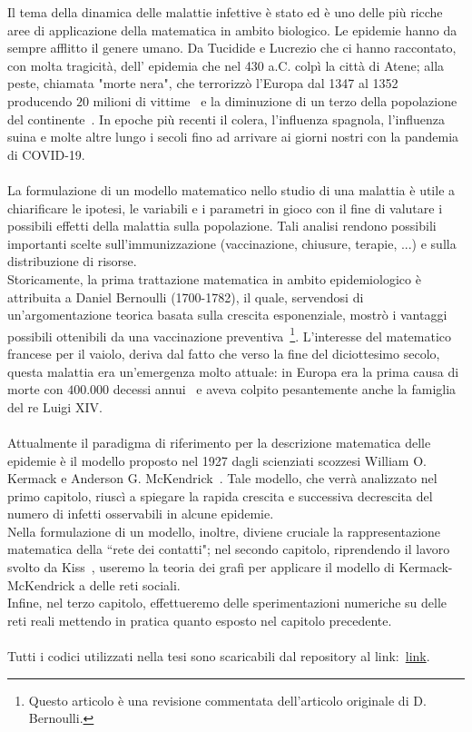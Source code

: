 \documentclass[12pt,a4paper,twoside]{report}
\begin{document}
Il tema della dinamica delle malattie infettive \`e stato ed \`e uno delle pi\`u ricche aree di applicazione della matematica in ambito biologico.  Le epidemie hanno  da sempre afflitto il genere umano.  Da Tucidide e Lucrezio che ci hanno raccontato,  con molta tragicit\`a,  dell' epidemia che nel 430 a.C.  colp\`i la citt\`a di Atene; alla  peste,  chiamata "morte nera",   che terrorizz\`o l'Europa dal 1347 al 1352 producendo $20$ milioni di vittime~\cite{ujvari2020storia} e  la diminuzione di  un terzo della popolazione del continente~\cite{alchon2003pest}.  In epoche pi\`u recenti il colera,  l'influenza spagnola,  l'influenza suina e molte altre lungo i  secoli fino ad arrivare ai giorni nostri con la pandemia di COVID-19.\\ \\
La formulazione di un modello matematico nello studio di una malattia \`e utile a chiarificare le ipotesi, le variabili e i parametri in gioco con il fine di valutare i possibili effetti della malattia sulla popolazione. Tali analisi rendono possibili importanti scelte sull'immunizzazione (vaccinazione,  chiusure,  terapie,  ...) e sulla distribuzione di risorse.\\ Storicamente,  la prima trattazione matematica in ambito   epidemiologico \`e attribuita  a Daniel Bernoulli (1700-1782), il quale, servendosi di un'argomentazione teorica basata sulla crescita esponenziale,  mostr\`o i  vantaggi possibili ottenibili da una vaccinazione preventiva~\cite{Bernoulli}\footnote{Questo articolo \`e una revisione commentata dell'articolo originale di D. Bernoulli.}. L'interesse del matematico  francese  per il vaiolo, deriva dal fatto che verso la fine del diciottesimo secolo,  questa malattia era  un'emergenza molto attuale: in Europa era la prima causa di morte con $400.000$ decessi annui~\cite{VAIOLO} e aveva colpito pesantemente anche la famiglia del re Luigi XIV.\\ \\
Attualmente il paradigma di riferimento per la descrizione matematica delle epidemie \`e il modello proposto nel 1927 dagli scienziati scozzesi William O. Kermack e Anderson G. McKendrick~\cite{kermack}.  Tale modello,  che verr\`a analizzato  nel primo capitolo,  riusc\`i a spiegare la rapida crescita e successiva decrescita del numero di infetti osservabili in alcune epidemie.\\ 
Nella formulazione di un modello, inoltre, diviene cruciale la rappresentazione matematica  della ``rete dei contatti"; nel secondo capitolo,  riprendendo il lavoro svolto da Kiss~\cite{KISS},  useremo la teoria dei grafi per applicare  il modello di Kermack-McKendrick a delle reti sociali.\\
Infine,  nel terzo capitolo,  effettueremo delle sperimentazioni  numeriche su delle reti reali mettendo in pratica quanto esposto nel capitolo precedente.\\ \\
Tutti i codici utilizzati nella tesi sono scaricabili dal  repository al link:~\url{link}.
\end{document}
